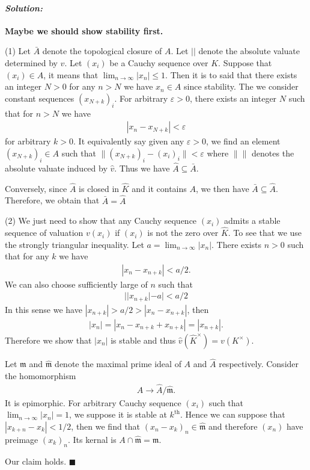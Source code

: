 \documentclass[12pt, a4paper]{article}
\newenvironment{solution}
  {\paragraph{\textit{Solution:}}\par\medskip}
  {\hfill$\blacksquare$\vspace{0.1cm}}
\begin{document}
\begin{solution}
    \textbf{Maybe we should show stability first.}

    (1) Let $\bar{A}$ denote the topological closure of $A$. Let $||$ denote the absolute valuate determined by $v$.
    Let $(x_i)$ be a Cauchy sequence over $K$. Suppose that $(x_i)\in \hat{A}$, it means that $\lim_{n\to\infty}|x_n|\le 1$. 
    Then it is to said that there exists an integer $N>0$ for any $n>N$ we have $x_n\in A$ since stability.  The we consider constant sequences $(x_{N+k})_i$.
    For arbitrary $\varepsilon>0$, there exists an integer $N$ such that for $n>N$ we have 
    \begin{align*}
        |x_n-x_{N+k}|<\varepsilon
    \end{align*}
    for arbitrary $k>0$. It equivalently say given any $\varepsilon>0$, we find an element $(x_{N+k})_i\in A$ such that $\|(x_{N+k})_i - (x_i)_i\|<\varepsilon$ where $\|\|$ denotes the absolute valuate induced by $\hat{v}$.
    Thus we have $\hat{A}\subseteq \bar{A}$.

    Conversely, since $\hat{A}$ is closed in $\hat{K}$ and it contains $A$, we then have $\bar{A}\subseteq \hat{A}$.
    Therefore, we obtain that $\bar{A}=  \hat{A}$

    (2) We just need to show that any Cauchy sequence $(x_i)$ admits a stable sequence of valuation $v(x_i)$ if $(x_i)$ is not the zero over $\hat{K}$.
    To see that we use the strongly triangular inequality. Let $a = \lim_{n\to \infty}|x_n|$. There exists $n>0$ such that for any $k$ we have 
    \begin{align*}
        |x_n-x_{n+k}|<a/2.
    \end{align*}
    We can also choose sufficiently large of $n$ such that
    \begin{align*}
        ||x_{n+k}|-a|<a/2
    \end{align*} 
    In this sense we have $|x_{n+k}|>a/2>|x_n-x_{n+k}|$, then 
    \begin{align*}
        |x_{n}| = |x_{n}-x_{n+k}+x_{n+k}| = |x_{n+k}|.
    \end{align*}
    Therefore we show that $|x_n|$ is stable and thus $\hat{v}(\hat{K}^\times) = v(K^\times)$. 

    Let $\mathfrak{m}$ and $\hat{\mathfrak{m}}$ denote the maximal prime ideal of $A$ and $\hat{A}$ respectively. 
    Consider the homomorphism 
    \begin{align*}
        A \to \hat{A}/\hat{\mathfrak{m}}.
    \end{align*}
    It is epimorphic. For arbitrary Cauchy sequence $(x_i)$ such that $\lim_{n\to\infty}|x_n| = 1$, we suppose it is stable at $k^{\text{th}}$.
    Hence we can suppose that $|x_{k+n}-x_k|<1/2$, then we find that $(x_n-x_k)_n\in \hat{\mathfrak{m}}$ and therefore $(x_n)$ have preimage $(x_k)_n$.
    Its kernal is $A\cap \hat{\mathfrak{m}} = \mathfrak{m}$.

    Our claim holds.
\end{solution}
\end{document}
